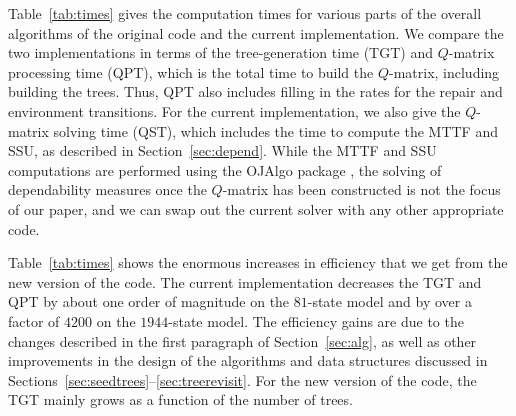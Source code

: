 \documentclass[12pt]{article}
\begin{document}
Table~\ref{tab:times} 
gives the computation times for
various parts of the overall algorithms
of the original code \cite{ING:2009}
and the current implementation.
We compare the two implementations in
terms of the tree-generation time (TGT)
and $Q$-matrix processing time (QPT),
which is the total time to build the
$Q$-matrix, including building the trees.
Thus, QPT also includes filling in the
rates for the repair
and environment transitions.
For the current implementation,
we also give the $Q$-matrix solving time
(QST), which includes the time to
compute the MTTF and SSU, 
as described
in Section~\ref{sec:depend}.
While the MTTF and SSU computations are performed
using the OJAlgo package \cite{OJAL:2013},
the solving of dependability
measures once the $Q$-matrix has been
constructed is not the focus of our paper,
and we can swap out the current solver
with any other appropriate code.

Table~\ref{tab:times} shows the
enormous increases in efficiency
that we get from the new version
of the code.
The current implementation
decreases the TGT and QPT
by about one order of
magnitude on the $81$-state model
and by over a factor of $4200$
on the $1944$-state model.
The efficiency gains are due to the
changes described
in the first paragraph
of Section~\ref{sec:alg},
as well as other improvements
in the design of the algorithms
and data structures
discussed in
Sections~\ref{sec:seedtrees}--\ref{sec:treerevisit}.
For the new version of the code,
the TGT mainly grows as a function
of the number of trees.



\end{document}
